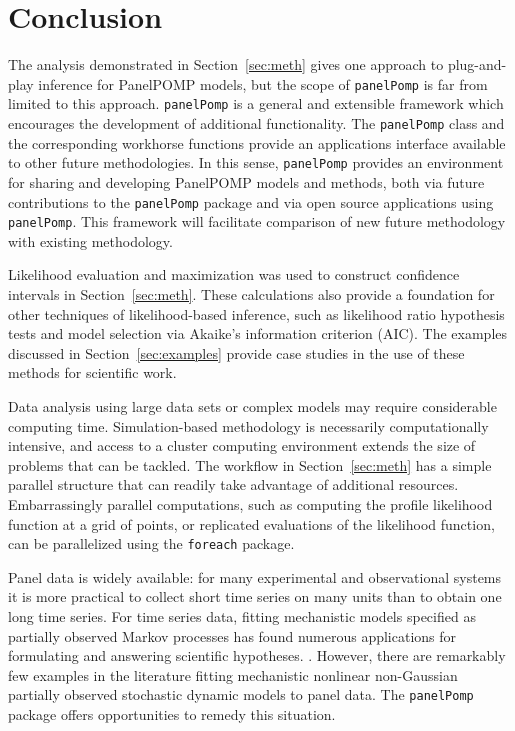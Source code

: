 \documentclass[12pt]{article}\usepackage[]{graphicx}\usepackage[table]{xcolor}
\newcommand\pkg{\texttt}
\newcommand\code{\texttt}
\newcommand\panelPomp{\texttt{panelPomp}\xspace}
\begin{document}
\section{Conclusion}

The analysis demonstrated in Section~\ref{sec:meth} gives one approach to plug-and-play inference for PanelPOMP models, but the scope of \panelPomp is far from limited to this approach.
\panelPomp is a general and extensible framework which encourages the development of additional functionality.
The \code{panelPomp} class and the corresponding workhorse functions provide an applications interface available to other future methodologies.
In this sense, \panelPomp provides an environment for sharing and developing PanelPOMP models and methods, both via future contributions to the \panelPomp package and via open source applications using \panelPomp.
This framework will facilitate comparison of new future methodology with existing methodology.

Likelihood evaluation and maximization was used to construct confidence intervals in Section~\ref{sec:meth}.
These calculations also provide a foundation for other techniques of likelihood-based inference, such as likelihood ratio hypothesis tests and model selection via Akaike's information criterion (AIC).
The examples discussed in Section~\ref{sec:examples} provide case studies in the use of these methods for scientific work.

Data analysis using large data sets or complex models may require considerable computing time.
Simulation-based methodology is necessarily computationally intensive, and access to a cluster computing environment extends the size of problems that can be tackled.
The workflow in Section~\ref{sec:meth} has a simple parallel structure that can readily take advantage of additional resources.
Embarrassingly parallel computations, such as computing the profile likelihood function at a grid of points, or replicated evaluations of the likelihood function, can be parallelized using the \pkg{foreach} package.

Panel data is widely available: for many experimental and observational systems it is more practical to collect short time series on many units than to obtain one long time series.
For time series data, fitting mechanistic models specified as partially observed Markov processes has found numerous applications for formulating and answering scientific hypotheses. \citep{breto09,king16}.
However, there are remarkably few examples in the literature fitting mechanistic nonlinear non-Gaussian partially observed stochastic dynamic models to panel data.
The \panelPomp package offers opportunities to remedy this situation.
\end{document}
